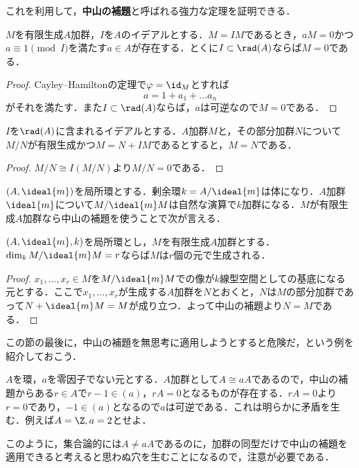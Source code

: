 これを利用して，\textbf{中山の補題}と呼ばれる強力な定理を証明できる．	

\begin{thm}[中山の補題]%
	$M$を有限生成$A$加群，$I$を$A$のイデアルとする．$M=IM$であるとき，$aM=0$かつ$a\equiv1\pmod{I}$を満たす$a\in A$が存在する．とくに$I\subset\rad(A)$ならば$M=0$である．
\end{thm}

\begin{proof}
	Cayley--Hamiltonの定理で$\varphi=\id_{M}$とすれば
	\[a=1+a_1+\dots a_n\]
	がそれを満たす．また$I\subset\rad(A)$ならば，$a$は可逆なので$M=0$である．
\end{proof}

\begin{cor}
	$I$を$\rad(A)$に含まれるイデアルとする．$A$加群$M$と，その部分加群$N$について$M/N$が有限生成かつ$M=N+IM$であるとすると，$M=N$である．
\end{cor}

\begin{proof}
	$M/N\cong I(M/N)$より$M/N=0$である．
\end{proof}

$(A,{\ideal{m}})$を局所環とする．剰余環$k=A/{\ideal{m}}$は体になり．$A$加群${\ideal{m}}$について$M/{\ideal{m}}M$は自然な演算で$k$加群になる．$M$が有限生成$A$加群なら中山の補題を使うことで次が言える．

\begin{prop}\label{prop:局所環上の有限生成加群の極小底}
	$(A,{\ideal{m}},k)$を局所環とし，$M$を有限生成$A$加群とする．$\dim_k M/{\ideal{m}}M=r$ならば$M$は$r$個の元で生成される．
\end{prop}

\begin{proof}
	$x_1,\dots,x_r\in M$を$M/{\ideal{m}}M$での像が$k$線型空間としての基底になる元とする．ここで$x_1,\dots,x_r$が生成する$A$加群を$N$とおくと，$N$は$M$の部分加群であって$N+{\ideal{m}}M=M$が成り立つ．よって中山の補題より$N=M$である．
\end{proof}

この節の最後に，中山の補題を無思考に適用しようとすると危険だ，という例を紹介しておこう．
\begin{ex}
	$A$を環，$a$を零因子でない元とする．$A$加群として$A\cong aA$であるので，中山の補題からある$r\in A$で$r-1\in(a)，rA=0$となるものが存在する．$rA=0$より$r=0$であり，$-1\in (a)$となるので$a$は可逆である．これは明らかに矛盾を生む．例えば$A=\Z, a=2$とせよ．
\end{ex}
このように，集合論的には$A\neq aA$であるのに，加群の同型だけで中山の補題を適用できると考えると思わぬ穴を生むことになるので，注意が必要である．

